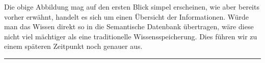 Die obige Abbildung mag auf den ersten Blick simpel erscheinen, wie aber bereits vorher erwähnt, handelt es sich um einen Übersicht der Informationen. Würde man das Wissen direkt so in die Semantische Datenbank übertragen, wäre diese nicht viel mächtiger als eine traditionelle Wissensspeicherung. Dies führen wir zu einem späteren Zeitpunkt noch genauer aus.\\

\vspace{0.1pt}
\noindent\rule[1ex]{\textwidth}{1pt}


